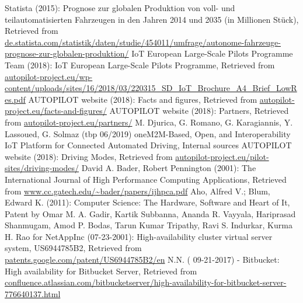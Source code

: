 

\begin{thebibliography}{..........}
   	  	Statista (2015):
                           	Prognose zur globalen Produktion von voll- und teilautomatisierten Fahrzeugen in den Jahren 2014 und 2035 (in Millionen Stück),
                              	Retrieved from \url{de.statista.com/statistik/daten/studie/454011/umfrage/autonome-fahrzeuge-prognose-zur-globalen-produktion/}
   	  	IoT European Large-Scale Pilots Programme Team (2018):
                           	IoT European Large-Scale Pilots Programme,
                              	Retrieved from \url{autopilot-project.eu/wp-content/uploads/sites/16/2018/03/220315_SD_IoT_Brochure_A4_Brief_LowRes.pdf}
   	  	AUTOPILOT website (2018):
                           	Facts and figures,
                              	Retrieved from \url{autopilot-project.eu/facts-and-figures/}
   	  	AUTOPILOT website (2018):
                           	Partners,
                              	Retrieved from \url{autopilot-project.eu/partners/}
   	  	M. Djurica, G. Romano, G. Karagiannis, Y. Lassoued, G. Solmaz (tbp 06/2019)
                           	oneM2M-Based, Open, and Interoperability IoT Platform for Connected Automated Driving,
                           	Internal sources
   	  	AUTOPILOT website (2018):
                           	Driving Modes,
                              	Retrieved from \url{autopilot-project.eu/pilot-sites/driving-modes/}
   	 	David A. Bader, Robert Pennington (2001): 
                               The International Journal of High Performance Computing Applications,
                               Retrieved from \url{www.cc.gatech.edu/~bader/papers/ijhpca.pdf}
   		Aho, Alfred V.; Blum, Edward K. (2011):
                              	Computer Science: The Hardware, Software and Heart of It,
   		Patent by Omar M. A. Gadir, Kartik Subbanna, Ananda R. Vayyala, Hariprasad Shanmugam, Amod P. Bodas, Tarun Kumar Tripathy, Ravi S. Indurkar, Kurma H. Rao  for NetAppInc (07-23-2001):
   				High-availability cluster virtual server system,
   				US6944785B2,
                              	Retrieved from \url{patents.google.com/patent/US6944785B2/en}
   	N.N. ( 09-21-2017) - Bitbucket:
                              	High availability for Bitbucket Server,
                              	Retrieved from \url{confluence.atlassian.com/bitbucketserver/high-availability-for-bitbucket-server-776640137.html}

\end{thebibliography}
